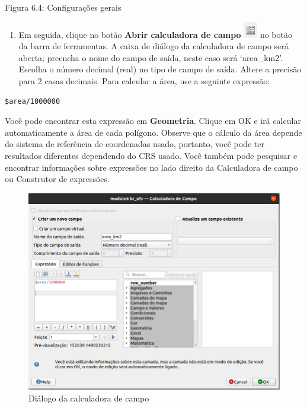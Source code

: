 \documentclass[
  portuguese,
]{krantz}
\providecommand{\tightlist}{%
  \setlength{\itemsep}{0pt}\setlength{\parskip}{0pt}}
\begin{document}
Figura 6.4: Configurações gerais

\begin{enumerate}
\def\labelenumi{\arabic{enumi}.}
\setcounter{enumi}{4}
\tightlist
\item
  Em seguida, clique no botão \textbf{Abrir calculadora de campo} \includegraphics{media/modulo6/field_calculator.png} no botão da barra de ferramentas. A caixa de diálogo da calculadora de campo será aberta; preencha o nome do campo de saída, neste caso será `area\_km2'. Escolha o número decimal (real) no tipo de campo de saída. Altere a precisão para 2 casas decimais. Para calcular a área, use a seguinte expressão:
\end{enumerate}

\begin{verbatim}
$area/1000000
\end{verbatim}

Você pode encontrar esta expressão em \textbf{Geometria}. Clique em OK e irá calcular automaticamente a área de cada polígono. Observe que o cálculo da área depende do sistema de referência de coordenadas usado, portanto, você pode ter resultados diferentes dependendo do CRS usado. Você também pode pesquisar e encontrar informações sobre expressões no lado direito da Calculadora de campo ou Construtor de expressões.

\begin{figure}
\centering
\includegraphics{media/modulo6/fieldcalc.png}
\caption{Diálogo da calculadora de campo}
\end{figure}
\end{document}
